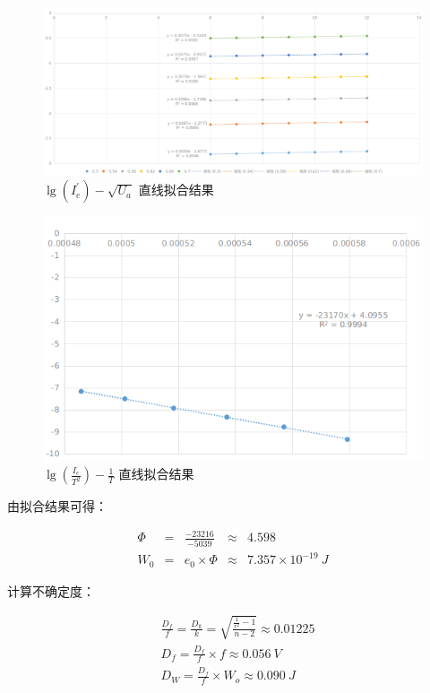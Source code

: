 \documentclass[a4paper]{article}
\begin{document}
\begin{figure}[H]
	\centering
	\includegraphics[width=0.9\linewidth]{figures/f1}
    \caption{$\lg(I_e^\prime)-\sqrt{U_a}$ 直线拟合结果}
\end{figure}

\begin{figure}[H]
	\centering
	\includegraphics[width=0.9\linewidth]{figures/f2}
    \caption{$\lg(\frac{I_e}{T^2})-\frac{1}{T}$ 直线拟合结果}
\end{figure}

\par 由拟合结果可得：

$$
\begin{array}{rcccl}
	\Phi&=&\frac{-23216}{-5039}&\approx&4.598\\
	W_0&=&e_0\times \Phi&\approx&7.357\times 10^{-19}\ J
\end{array}
$$

\par 计算不确定度：

$$
\begin{array}{cl}
	&\frac{D_f}{f}=\frac{D_k}{k}=\sqrt{\frac{\frac{1}{r^2}-1}{n-2}}\approx 0.01225\\
	&D_f=\frac{D_f}{f}\times f\approx 0.056\ V\\
	&D_W=\frac{D_f}{f}\times W_o\approx 0.090\ J
\end{array}
$$
\end{document}
